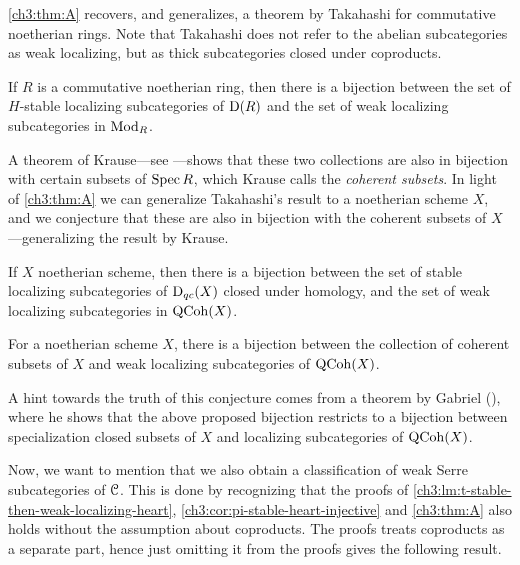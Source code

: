 \cref{ch3:thm:A} recovers, and generalizes, a theorem by Takahashi for commutative noetherian rings. Note that Takahashi does not refer to the abelian subcategories as weak localizing, but as thick subcategories closed under coproducts. 

\begin{corollary}
    \label{ch3:cor:takahashi-weak-localizing}
    If $R$ is a commutative noetherian ring, then there is a bijection between the set of $H$-stable localizing subcategories of $\mathrm{D}(R)$ and the set of weak localizing subcategories in $\mathrm{Mod}_R$. 
\end{corollary}

A theorem of Krause---see \cite[3.1]{krause_2008}---shows that these two collections are also in bijection with certain subsets of $\operatorname{Spec} R$, which Krause calls the \emph{coherent subsets}. In light of \cref{ch3:thm:A} we can generalize Takahashi's result to a noetherian scheme $X$, and we conjecture that these are also in bijection with the coherent subsets of $X$---generalizing the result by Krause.  

\begin{corollary}
    \label{ch3:cor:noetherian-scheme-weak-localizing}
    If $X$ noetherian scheme, then there is a bijection between the set of stable localizing subcategories of $\mathrm{D}_{qc}(X)$ closed under homology, and the set of weak localizing subcategories in $\operatorname{QCoh}(X)$. 
\end{corollary}

\begin{conjecture}
    \label{ch3:conj:coherent-noetherian-scheme}
    For a noetherian scheme $X$, there is a bijection between the collection of coherent subsets of $X$ and weak localizing subcategories of $\operatorname{QCoh}(X)$. 
\end{conjecture}

\begin{remark}
    A hint towards the truth of this conjecture comes from a theorem by Gabriel (\cite[VI.2.4(b)]{gabriel_1962}), where he shows that the above proposed bijection restricts to a bijection between specialization closed subsets of $X$ and localizing subcategories of $\operatorname{QCoh}(X)$. 
\end{remark}

Now, we want to mention that we also obtain a classification of weak Serre subcategories of $\EuScript{C}$. This is done by recognizing that the proofs of \cref{ch3:lm:t-stable-then-weak-localizing-heart}, \cref{ch3:cor:pi-stable-heart-injective} and \cref{ch3:thm:A} also holds without the assumption about coproducts. The proofs treats coproducts as a separate part, hence just omitting it from the proofs gives the following result. 

